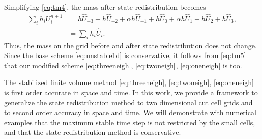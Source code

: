 Simplifying \eqref{eq:tm4}, the mass after state redistribution becomes
\begin{equation}\label{eq:tm5}
\begin{aligned}
\sum_{i} h_i U^{n+1}_i  &= h \widehat{U}_{-3} + h \widehat{U}_{-2} + \alpha h \widehat{U}_{-1} +h \widehat{U}_0+\alpha h \widehat{U}_{1} + h \widehat{U}_{2} + h \widehat{U}_{3},\\
&= \sum_{i} h_i \widehat{U}_i.
\end{aligned}
\end{equation}
Thus, the mass on the grid before and after state redistribution does not change.
Since the base scheme \eqref{eq:unstable1d} is conservative, it follows from
\eqref{eq:tm5} that our modified scheme \eqref{eq:threeneigh},
\eqref{eq:twoneigh}, \eqref{eq:oneneigh} is too.




The stabilized finite volume method \eqref{eq:threeneigh},
\eqref{eq:twoneigh}, \eqref{eq:oneneigh} is first order accurate in space
and time.  In this work, we provide a framework to generalize the state
redistribution method to two dimensional cut cell grids and to 
second order accuracy in space and time.
We will demonstrate with numerical examples that the maximum stable time step is 
not restricted by the small cells, and that the state redistribution method 
is conservative.













